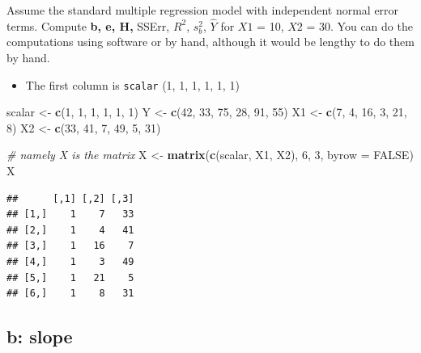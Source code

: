 \documentclass[
]{article}
\newenvironment{Shaded}{\begin{snugshade}}{\end{snugshade}}
\newcommand{\CommentTok}[1]{\textcolor[rgb]{0.56,0.35,0.01}{\textit{#1}}}
\newcommand{\DataTypeTok}[1]{\textcolor[rgb]{0.13,0.29,0.53}{#1}}
\newcommand{\DecValTok}[1]{\textcolor[rgb]{0.00,0.00,0.81}{#1}}
\newcommand{\KeywordTok}[1]{\textcolor[rgb]{0.13,0.29,0.53}{\textbf{#1}}}
\newcommand{\NormalTok}[1]{#1}
\newcommand{\OtherTok}[1]{\textcolor[rgb]{0.56,0.35,0.01}{#1}}
\newcommand{\StringTok}[1]{\textcolor[rgb]{0.31,0.60,0.02}{#1}}
\providecommand{\tightlist}{%
  \setlength{\itemsep}{0pt}\setlength{\parskip}{0pt}}
\begin{document}
Assume the standard multiple regression model with independent normal
error terms. Compute \textbf{b, e, H,} SSErr, \(R^2\), \(s^2_b\),
\(\hat{Y}\) for \(X1\) = 10, \(X2\) = 30. You can do the computations
using software or by hand, although it would be lengthy to do them by
hand.

\begin{itemize}
\tightlist
\item
  The first column is \texttt{scalar} (1, 1, 1, 1, 1, 1)
\end{itemize}

\begin{Shaded}
\begin{Highlighting}[]
\NormalTok{scalar <-}\StringTok{ }\KeywordTok{c}\NormalTok{(}\DecValTok{1}\NormalTok{, }\DecValTok{1}\NormalTok{, }\DecValTok{1}\NormalTok{, }\DecValTok{1}\NormalTok{, }\DecValTok{1}\NormalTok{, }\DecValTok{1}\NormalTok{)}
\NormalTok{Y <-}\StringTok{  }\KeywordTok{c}\NormalTok{(}\DecValTok{42}\NormalTok{, }\DecValTok{33}\NormalTok{, }\DecValTok{75}\NormalTok{, }\DecValTok{28}\NormalTok{, }\DecValTok{91}\NormalTok{, }\DecValTok{55}\NormalTok{)}
\NormalTok{X1 <-}\StringTok{  }\KeywordTok{c}\NormalTok{(}\DecValTok{7}\NormalTok{, }\DecValTok{4}\NormalTok{, }\DecValTok{16}\NormalTok{, }\DecValTok{3}\NormalTok{, }\DecValTok{21}\NormalTok{, }\DecValTok{8}\NormalTok{)}
\NormalTok{X2 <-}\StringTok{  }\KeywordTok{c}\NormalTok{(}\DecValTok{33}\NormalTok{, }\DecValTok{41}\NormalTok{, }\DecValTok{7}\NormalTok{, }\DecValTok{49}\NormalTok{, }\DecValTok{5}\NormalTok{, }\DecValTok{31}\NormalTok{)}

\CommentTok{# namely X is the matrix}
\NormalTok{X <-}\StringTok{ }\KeywordTok{matrix}\NormalTok{(}\KeywordTok{c}\NormalTok{(scalar, X1, X2), }\DecValTok{6}\NormalTok{, }\DecValTok{3}\NormalTok{, }\DataTypeTok{byrow =} \OtherTok{FALSE}\NormalTok{)}
\NormalTok{X}
\end{Highlighting}
\end{Shaded}

\begin{verbatim}
##      [,1] [,2] [,3]
## [1,]    1    7   33
## [2,]    1    4   41
## [3,]    1   16    7
## [4,]    1    3   49
## [5,]    1   21    5
## [6,]    1    8   31
\end{verbatim}

\hypertarget{b-slope}{%
\subsection{b: slope}\label{b-slope}}
\end{document}
